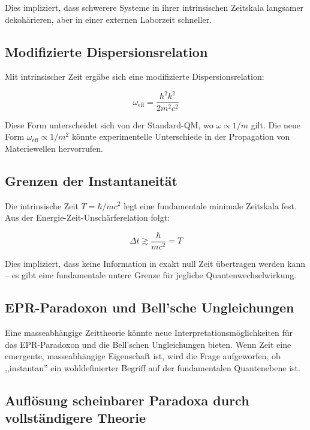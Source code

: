 \documentclass[12pt,a4paper]{article}  %
\begin{document}
	Dies impliziert, dass schwerere Systeme in ihrer intrinsischen Zeitskala langsamer dekohärieren, aber in einer externen Laborzeit schneller.
	
	\subsection{Modifizierte Dispersionsrelation}
	
	Mit intrinsischer Zeit ergäbe sich eine modifizierte Dispersionsrelation:
	
	\begin{equation}
		\omega_{\text{eff}} = \frac{\hbar^2 k^2}{2 m^2 c^2}
	\end{equation}
	
	Diese Form unterscheidet sich von der Standard-QM, wo $\omega \propto 1/m$ gilt. Die neue Form $\omega_{\text{eff}} \propto 1/m^2$ könnte experimentelle Unterschiede in der Propagation von Materiewellen hervorrufen.
	
	\subsection{Grenzen der Instantaneität}
	
	Die intrinsische Zeit $T = \hbar/mc^2$ legt eine fundamentale minimale Zeitskala fest. Aus der Energie-Zeit-Unschärferelation folgt:
	
	\begin{equation}
		\Delta t \gtrsim \frac{\hbar}{mc^2} = T
	\end{equation}
	
	Dies impliziert, dass keine Information in exakt null Zeit übertragen werden kann – es gibt eine fundamentale untere Grenze für jegliche Quantenwechselwirkung.
	
	\subsection{EPR-Paradoxon und Bell'sche Ungleichungen}
	
	Eine masseabhängige Zeittheorie könnte neue Interpretationsmöglichkeiten für das EPR-Paradoxon und die Bell'schen Ungleichungen bieten. Wenn Zeit eine emergente, masseabhängige Eigenschaft ist, wird die Frage aufgeworfen, ob ,,instantan'' ein wohldefinierter Begriff auf der fundamentalen Quantenebene ist.
	
	\subsection{Auflösung scheinbarer Paradoxa durch vollständigere Theorie}
	
\end{document}
